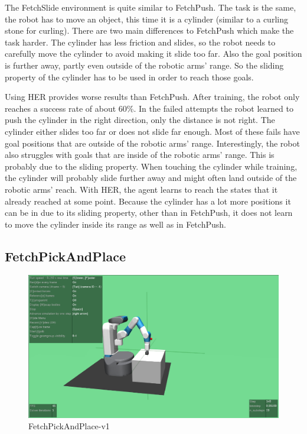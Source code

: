 The FetchSlide environment is quite similar to FetchPush. The task is the same, the robot has to move an object, this time it is a cylinder (similar to a curling stone for curling). There are two main differences to FetchPush which make the task harder. The cylinder has less friction and slides, so the robot needs to carefully move the cylinder to avoid making it slide too far. Also the goal position is further away, partly even outside of the robotic arms' range. So the sliding property of the cylinder has to be used in order to reach those goals. 

\vspace{0.5cm}

Using HER provides worse results than FetchPush. After training, the robot only reaches a success rate of about 60\%. 
In the failed attempts the robot learned to push the cylinder in the right direction, only the distance is not right. The cylinder either slides too far or does not slide far enough. Most of these fails have goal positions that are outside of the robotic arms' range. Interestingly, the robot also struggles with goals that are inside of the robotic arms' range. This is probably due to the sliding property. When touching the cylinder while training, the cylinder will probably slide further away and might often land outside of the robotic arms' reach. With HER, the agent learns to reach the states that it already reached at some point. Because the cylinder has a lot more positions it can be in due to its sliding property, other than in FetchPush, it does not learn to move the cylinder inside its range as well as in FetchPush.    

\subsection{FetchPickAndPlace}

\begin{figure} [h]
	
	\centering
	\includegraphics[width=1\textwidth]{figures/FetchPickAndPlace-v1.pdf}
	\caption{FetchPickAndPlace-v1}
	\label{pickplace2}
\end{figure}

